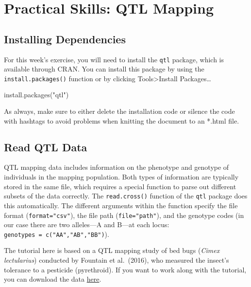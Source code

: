 \documentclass[
]{book}
\newenvironment{Shaded}{\begin{snugshade}}{\end{snugshade}}
\newcommand{\AttributeTok}[1]{\textcolor[rgb]{0.77,0.63,0.00}{#1}}
\newcommand{\NormalTok}[1]{#1}
\newcommand{\StringTok}[1]{\textcolor[rgb]{0.31,0.60,0.02}{#1}}
\begin{document}
\hypertarget{practical-skills-qtl-mapping}{%
\section{Practical Skills: QTL Mapping}\label{practical-skills-qtl-mapping}}

\hypertarget{installing-dependencies-1}{%
\subsection{Installing Dependencies}\label{installing-dependencies-1}}

For this week's exercise, you will need to install the \texttt{qtl} package, which is available through CRAN. You can install this package by using the \texttt{install.packages()} function or by clicking Tools\textgreater Install Packages\ldots{}

\begin{Shaded}
\begin{Highlighting}[]
\NormalTok{install}\AttributeTok{.packages}\NormalTok{(}\StringTok{"qtl"}\NormalTok{)}
\end{Highlighting}
\end{Shaded}

As always, make sure to either delete the installation code or silence the code with hashtags to avoid problems when knitting the document to an *.html file.

\hypertarget{read-qtl-data}{%
\subsection{Read QTL Data}\label{read-qtl-data}}

QTL mapping data includes information on the phenotype and genotype of individuals in the mapping population. Both types of information are typically stored in the same file, which requires a special function to parse out different subsets of the data correctly. The \texttt{read.cross()} function of the \texttt{qtl} package does this automatically. The different arguments within the function specify the file format (\texttt{format="csv"}), the file path (\texttt{file="path"}), and the genotype codes (in our case there are two alleles---A and B---at each locus: \texttt{genotypes\ =\ c("AA","AB","BB")}).

The tutorial here is based on a QTL mapping study of bed bugs (\emph{Cimex lectularius}) conducted by Fountain et al.~(2016), who measured the insect's tolerance to a pesticide (pyrethroid). If you want to work along with the tutorial, you can download the data \href{data/8_bedbugs_cross_data.csv}{here}.
\end{document}
